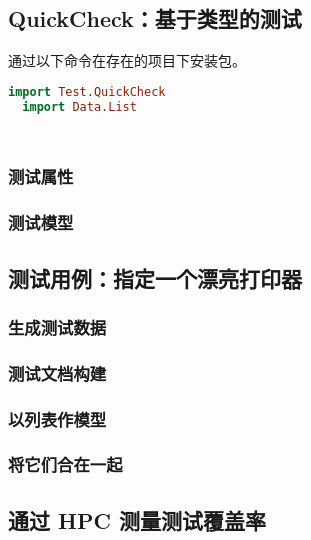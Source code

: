 \documentclass[./main.tex]{subfiles}
\begin{document}
\subsection*{QuickCheck：基于类型的测试}

通过以下命令在存在的项目下安装包。

\begin{lstlisting}[language=Haskell]
  import Test.QuickCheck
  import Data.List
\end{lstlisting}

\begin{lstlisting}[language=Haskell]

\end{lstlisting}

\begin{lstlisting}[language=Haskell]

\end{lstlisting}

\subsubsection*{测试属性}

\subsubsection*{测试模型}

\subsection*{测试用例：指定一个漂亮打印器}

\subsubsection*{生成测试数据}

\subsubsection*{测试文档构建}

\subsubsection*{以列表作模型}

\subsubsection*{将它们合在一起}

\subsection*{通过 HPC 测量测试覆盖率}
\end{document}
